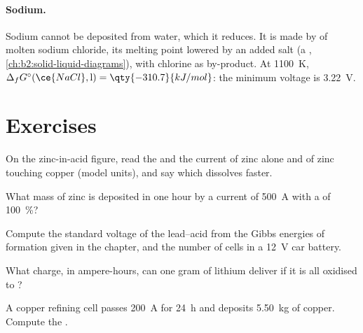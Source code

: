 \paragraph{Sodium.} Sodium cannot be deposited from water, which it reduces.
It is made by  of molten sodium chloride, its melting point
lowered by an added salt (a , \cref{ch:b2:solid-liquid-diagrams}),
with chlorine as by-product. At \qty{1100}{K}, $\Delta_f G^\circ(\ce{NaCl}, \text{l}) =
\qty{-310.7}{kJ/mol}$: the minimum voltage is \qty{3.22}{V}.

\section{Exercises}

\begin{exercise}[$\star$]\label{exo:b2:batteries-electrolysis:1}
On the zinc-in-acid figure, read the  and the current of zinc
alone and of zinc touching copper (model units), and say which dissolves
faster.
\end{exercise}

\begin{exercise}[$\star$]\label{exo:b2:batteries-electrolysis:2}
What mass of zinc is deposited in one hour by a current of \qty{500}{A} with a
 of 100~\%?
\end{exercise}

\begin{exercise}[$\star$]\label{exo:b2:batteries-electrolysis:3}
Compute the standard voltage of the lead--acid  from the Gibbs
energies of formation given in the chapter, and the number of cells in a
\qty{12}{V} car battery.
\end{exercise}

\begin{exercise}[$\star$]\label{exo:b2:batteries-electrolysis:4}
What charge, in ampere-hours, can one gram of lithium deliver if it is all
oxidised to ?
\end{exercise}

\begin{exercise}[$\star\star$]\label{exo:b2:batteries-electrolysis:5}
A copper refining cell passes \qty{200}{A} for \qty{24}{h} and deposits
\qty{5.50}{kg} of copper. Compute the .
\end{exercise}


